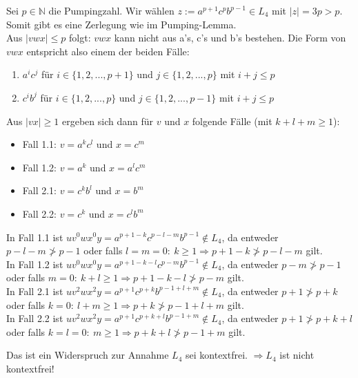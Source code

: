 	Sei $p \in \mathbb{N}$ die Pumpingzahl. Wir wählen $z := a^{p+1}c^pb^{p-1} \in L_4$ mit $|z| = 3p > p$. Somit gibt es eine Zerlegung wie im Pumping-Lemma. \\
	Aus $|vwx| \leq p$ folgt: $vwx$ kann nicht aus a's, c's und b's bestehen. Die Form von $vwx$ entspricht also einem der beiden Fälle:
	\begin{enumerate}
		\item $a^ic^j$ für $i \in \{1,2,...,p+1\}$ und $j \in \{1,2,...,p\}$ mit $i+j \leq p$
		\item $c^ib^j$ für $i \in \{1,2,...,p\}$ und $j \in \{1,2,...,p-1\}$ mit $i+j \leq p$
	\end{enumerate}
	Aus $|vx| \geq 1$ ergeben sich dann für $v$ und $x$ folgende Fälle (mit $k+l+m  \geq 1$):
	\begin{itemize}
		\item Fall 1.1: $v=a^kc^l$ und $x=c^m$
		\item Fall 1.2: $v=a^k$ und $x=a^lc^m$
		\item Fall 2.1: $v=c^kb^l$ und $x=b^m$
		\item Fall 2.2: $v=c^k$ und $x=c^lb^m$
	\end{itemize}
	In Fall 1.1 ist $uv^0wx^0y=a^{p+1-k}c^{p-l-m}b^{p-1} \notin L_4$, da entweder $p-l-m \ngtr p-1$ oder falls $l=m=0:\ k\geq 1 \Rightarrow p+1-k \ngtr p-l-m$ gilt.\\
	In Fall 1.2 ist $uv^0wx^0y=a^{p+1-k-l}c^{p-m}b^{p-1} \notin L_4$, da entweder $p-m \ngtr p-1$ oder falls $m=0:\ k+l\geq 1 \Rightarrow p+1-k-l \ngtr p-m$ gilt.\\
	In Fall 2.1 ist $uv^2wx^2y=a^{p+1}c^{p+k}b^{p-1+l+m} \notin L_4$, da entweder $p+1 \ngtr p+k$ oder falls $k=0:\ l+m\geq 1 \Rightarrow p+k \ngtr p-1+l+m$ gilt.\\
	In Fall 2.2 ist $uv^2wx^2y=a^{p+1}c^{p+k+l}b^{p-1+m} \notin L_4$, da entweder $p+1 \ngtr p+k+l$ oder falls $k=l=0:\ m\geq 1 \Rightarrow p+k+l \ngtr p-1+m$ gilt.
	
	Das ist ein Widerspruch zur Annahme $L_4$ sei kontextfrei. $\Rightarrow L_4$ ist nicht kontextfrei!